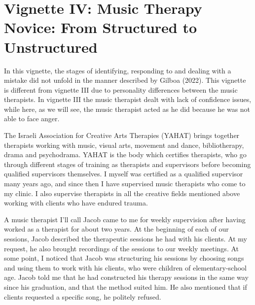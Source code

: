 \documentclass[authordate, empirical, issue]{jote-new-article}
\begin{document}
\section{Vignette IV: Music Therapy Novice: From Structured to Unstructured}



In this vignette, the stages of identifying, responding to and dealing with a mistake did not unfold in the manner described by Gilboa (2022). This vignette is different from vignette III due to personality differences between the music therapists. In vignette III the music therapist dealt with lack of confidence issues, while here, as we will see, the music therapist acted as he did because he was not able to face anger.



The Israeli Association for Creative Arts Therapies (YAHAT) brings together therapists working with music, visual arts, movement and dance, bibliotherapy, drama and psychodrama. YAHAT is the body which certifies therapists, who go through different stages of training as therapists and supervisors before becoming qualified supervisors themselves. I myself was certified as a qualified supervisor many years ago, and since then I have supervised music therapists who come to my clinic. I also supervise therapists in all the creative fields mentioned above working with clients who have endured trauma.



A music therapist I'll call Jacob came to me for weekly supervision after having worked as a therapist for about two years. At the beginning of each of our sessions, Jacob described the therapeutic sessions he had with his clients. At my request, he also brought recordings of the sessions to our weekly meetings. At some point, I noticed that Jacob was structuring his sessions by choosing songs and using them to work with his clients, who were children of elementary-school age. Jacob told me that he had constructed his therapy sessions in the same way since his graduation, and that the method suited him. He also mentioned that if clients requested a specific song, he politely refused.
\end{document}
